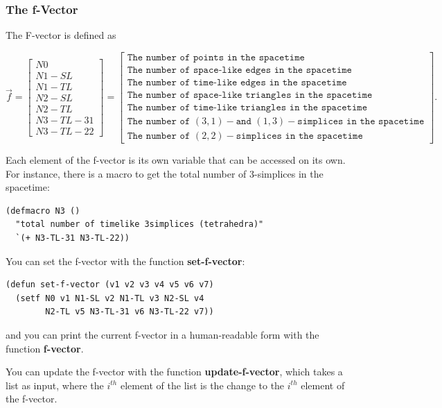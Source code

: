 \documentclass[12pt]{article}
\begin{document}
\subsubsection{The f-Vector}
The F-vector is defined as 
\begin{small}
\begin{displaymath}
  \vec{f} = \left[\begin{array}{c}N0\\N1-SL\\N1-TL\\N2-SL\\N2-TL\\
      N3-TL-31\\N3-TL-22\end{array}\right]
  = \left[\begin{array}{c}\texttt{The number of points in the spacetime}\\
      \texttt{The number of space-like edges in the spacetime}\\
      \texttt{The number of time-like edges in the spacetime}\\
      \texttt{The number of space-like triangles in the spacetime}\\
      \texttt{The number of time-like triangles in the spacetime}\\
      \texttt{The number of }(3,1)-\texttt{and }(1,3)-\texttt{simplices in the spacetime}\\
      \texttt{The number of }(2,2)-\texttt{simplices in the spacetime}\end{array}\right].
\end{displaymath}
\end{small}
Each element of the f-vector is its own variable that can be accessed
on its own. For instance, there is a macro to get the total number of
3-simplices in the spacetime:
\begin{lstlisting}
(defmacro N3 ()
  "total number of timelike 3simplices (tetrahedra)"
  `(+ N3-TL-31 N3-TL-22))
\end{lstlisting}
You can set the f-vector with the function \textbf{set-f-vector}:
\begin{lstlisting}
(defun set-f-vector (v1 v2 v3 v4 v5 v6 v7)
  (setf N0 v1 N1-SL v2 N1-TL v3 N2-SL v4
        N2-TL v5 N3-TL-31 v6 N3-TL-22 v7))
\end{lstlisting}
and you can print the current f-vector in a human-readable form with
the function \textbf{f-vector}.

You can update the f-vector with the function
\textbf{update-f-vector}, which takes a list as input, where the
$i^{th}$ element of the list is the change to the $i^{th}$ element of
the f-vector.
\end{document}
